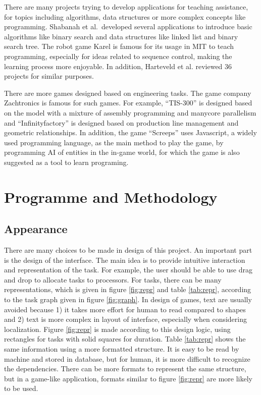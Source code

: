 \documentclass[a4paper,11pt]{article}
\begin{document}
There are many projects trying to develop applications for teaching assistance, for topics including algorithms, data structures or more complex concepts like programming. Shabanah et al.\ developed several applications to introduce basic algorithms like binary search and data structures like linked list and binary search tree. The robot game Karel is famous for its usage in MIT to teach programming, especially for ideas related to sequence control, making the learning process more enjoyable. In addition, Harteveld et al. reviewed 36 projects for similar purposes.

There are more games designed based on engineering tasks. The game company Zachtronics is famous for such games. For example, ``TIS-300'' is designed based on the model with a mixture of assembly programming and manycore parallelism and ``Infinityfactory'' is designed based on production line management and geometric relationships. In addition, the game ``Screeps'' uses Javascript, a widely used programming language, as the main method to play the game, by programming AI of entities in the in-game world, for which the game is also suggested as a tool to learn programing.

\section{Programme and Methodology}

\subsection{Appearance} \label{sec:aprc}

There are many choices to be made in design of this project. An important part is the design of the interface. The main idea is to provide intuitive interaction and representation of the task. For example, the user should be able to use drag and drop to allocate tasks to processors. For tasks, there can be many representations, which is given in figure \ref{fig:repr} and table \ref{tab:repr}, according to the task graph given in figure \ref{fig:graph}. In design of games, text are usually avoided because 1) it takes more effort for human to read compared to shapes and 2) text is more complex in layout of interface, especially when considering localization. Figure \ref{fig:repr} is made according to this design logic, using rectangles for tasks with solid squares for duration. Table \ref{tab:repr} shows the same information using a more formatted structure. It is easy to be read by machine and stored in database, but for human, it is more difficult to recognize the dependencies. There can be more formats to represent the same structure, but in a game-like application, formats similar to figure \ref{fig:repr} are more likely to be used.
\end{document}
